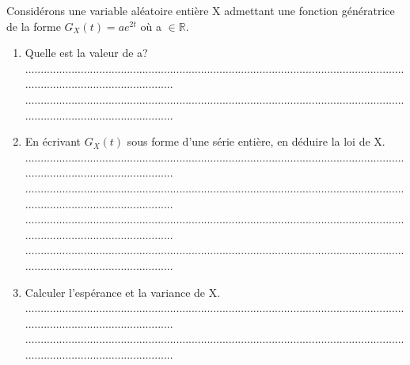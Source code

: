 \documentclass{article}
\begin{document}
\begin{footnotesize}
Considérons une variable aléatoire entière X admettant une fonction génératrice de la forme $G_{X}(t) = ae^{2t}$ où a $\in \mathbb{R}$.
\begin{enumerate}
    \item Quelle est la valeur de a?\newline\newline
    ...........................................................................................................................................................................\newline
    ...........................................................................................................................................................................\newline\newline
    \item En écrivant $G_{X}(t)$ sous forme d'une série entière, en déduire la loi de X.\newline\newline
    ...........................................................................................................................................................................\newline
    ...........................................................................................................................................................................\newline
    ...........................................................................................................................................................................\newline
    ...........................................................................................................................................................................\newline\newline
    \item Calculer l'espérance et la variance de X.\newline\newline
    ...........................................................................................................................................................................\newline
    ...........................................................................................................................................................................\newline

\end{enumerate}
\end{footnotesize}
\end{document}
